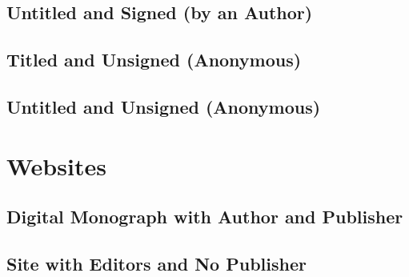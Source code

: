 \documentclass{article}
\begin{document}
\subsection{Untitled and Signed (by an Author)} %
\label{sub:untitled_and_signed_by_an_author}
\begin{refsection}
	\printbibliography[heading=none]
\end{refsection}
\subsection{Titled and Unsigned (Anonymous)} %
\label{sub:titled_and_unsigned_anonymous}
\begin{refsection}
	\printbibliography[heading=none]
\end{refsection}
\subsection{Untitled and Unsigned (Anonymous)} %
\label{sub:untitled_and_unsigned_anonymous}
\begin{refsection}
	\printbibliography[heading=none]
\end{refsection}

\section{Websites} %
\label{sec:websites}
\subsection{Digital Monograph with Author and Publisher} %
\label{sub:digital_monograph_with_author_and_publisher}
\begin{refsection}
	\printbibliography[heading=none]
\end{refsection}
\subsection{Site with Editors and No Publisher} %
\label{sub:site_with_editors_and_no_publisher}
\begin{refsection}
	\printbibliography[heading=none]
\end{refsection}
\end{document}
